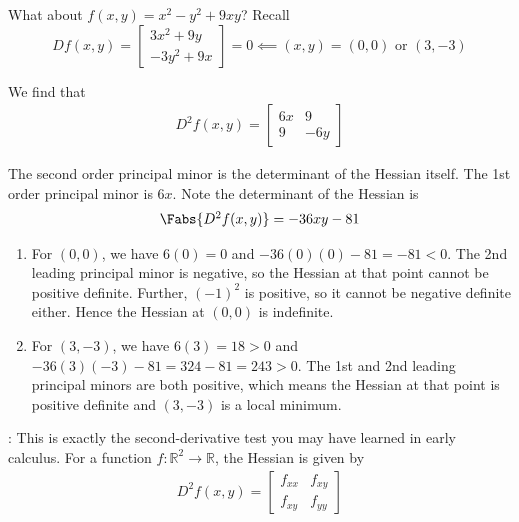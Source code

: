 \documentclass{article}
\begin{document}
What about $f(x, y) = x^2 - y^2 + 9xy$? Recall
\[
  D f(x, y) = \left[\begin{matrix}
    3x^2 + 9y \\
    -3y^2 + 9x
  \end{matrix}\right]
  = 0
  \impliedby (x, y) = (0, 0) \text{ or } (3, -3)
\]

We find that
\begin{equation}
  \begin{array}{c}
    D^2 f(x, y) = \left[\begin{matrix}
        6x & 9 \\
        9  & -6y
    \end{matrix}\right]
  \end{array}
  \nonumber
\end{equation}

The second order principal minor is the determinant of the Hessian itself. The 1st order principal minor is $6x$. Note the determinant of the Hessian is
\begin{equation}
  \begin{array}{c}
    \Fabs{D^2 f(x, y)} = -36xy - 81
  \end{array}
  \nonumber
\end{equation}

\begin{enumerate}
  \item For $(0, 0)$, we have $6(0) = 0$ and $-36(0)(0) - 81 = -81 < 0$. The 2nd leading principal minor is negative, so the Hessian at that point cannot be positive definite. Further, $(-1)^2$ is positive, so it cannot be negative definite either. Hence the Hessian at $(0, 0)$ is indefinite.

  \item For $(3, -3)$, we have $6(3) = 18 > 0$ and $-36(3)(-3) - 81 = 324 - 81 = 243 > 0$. The 1st and 2nd leading principal minors are both positive, which means the Hessian at that point is positive definite and $(3, -3)$ is a local minimum.
\end{enumerate}

\NB: This is exactly the second-derivative test you may have learned in early calculus. For a function $f: \mathbb{R}^2 \to \mathbb{R}$, the Hessian is given by
\begin{align*}
  D^2f(x, y)
  =
  \begin{bmatrix}
    f_{xx} & f_{xy} \\ f_{xy} & f_{yy}
  \end{bmatrix}
\end{align*}
\end{document}
